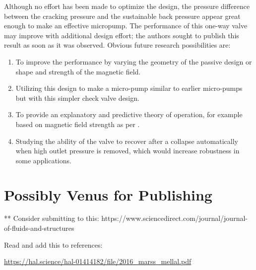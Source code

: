 \documentclass{asme2ej}
\begin{document}
Although no effort has been made to optimize the design, the pressure
difference between the cracking pressure and the sustainable back
pressure appear great enough to make an effective micropump. The
performance of this one-way valve may improve with additional design
effort; the authors sought to publish this result as soon as it was
observed.  Obvious future research possibilities are:
\begin{enumerate}
\item  To improve the
performance by varying the geometry of the passive design or shape and
strength of the magnetic field.
\item Utilizing this design to make a micro-pump
similar to earlier micro-pumps but with this simpler check valve
design.
\item To provide an explanatory and predictive theory of operation,
for example based on magnetic field strength as per \cite{ando2009ferrofluidic}.
\item Studying the ability of the valve to recover after
  a collapse automatically when high outlet pressure is removed,
  which would increase robustness in some applications.
\end{enumerate}

\section{Possibly Venus for Publishing}


** Consider submitting to this: https://www.sciencedirect.com/journal/journal-of-fluids-and-structures


Read and add this to references:

\url{https://hal.science/hal-01414182/file/2016_marss_mellal.pdf}


%




\end{document}
